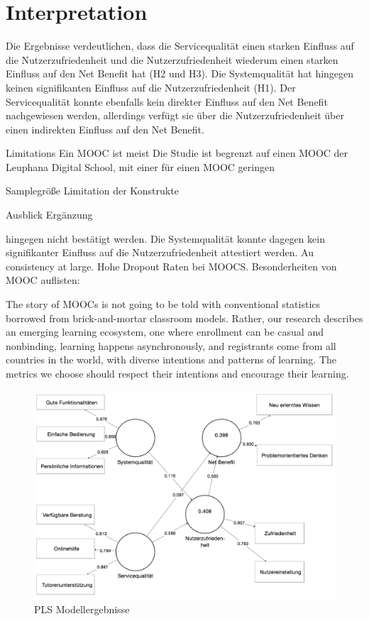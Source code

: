 \section{Interpretation}
\label{sec:vergleich}
Die Ergebnisse verdeutlichen, dass die Servicequalität einen starken Einfluss auf die Nutzerzufriedenheit und die Nutzerzufriedenheit wiederum einen starken Einfluss auf den Net Benefit hat (H2 und H3). Die Systemqualität hat hingegen keinen signifikanten Einfluss auf die Nutzerzufriedenheit (H1). Der Servicequalität konnte ebenfalls kein direkter Einfluss auf den Net Benefit nachgewiesen werden, allerdings verfügt sie über die Nutzerzufriedenheit über einen indirekten Einfluss auf den Net Benefit. 
	

Limitations
Ein MOOC ist meist Die Studie ist begrenzt auf einen MOOC der Leuphana Digital School, mit einer für einen MOOC geringen 

Samplegröße
Limitation der Konstrukte

Ausblick
Ergänzung 



  hingegen nicht bestätigt werden. Die Systemqualität konnte dagegen kein signifikanter Einfluss auf die Nutzerzufriedenheit attestiert werden. Au 
\todo consistency at large. 
Hohe Dropout Raten bei MOOCS. Besonderheiten von MOOC auflisten: 


The story of MOOCs is not going to be told with conventional statistics borrowed from brick-and-mortar classroom models. Rather, our research describes an emerging learning ecosystem, one where enrollment can be casual and nonbinding, learning happens asynchronously, and registrants come from all countries in the world, with diverse intentions and patterns of learning. The metrics we choose should respect their intentions and encourage their learning.\parencite{reich2014tricky}


\begin{figure}[h]
\centering
\includegraphics[width=1\textwidth]{Grafiken/pls_bw_3.png}
\caption{PLS Modellergebnisse}
\label{PLS Modellergebnisse}
\end{figure}